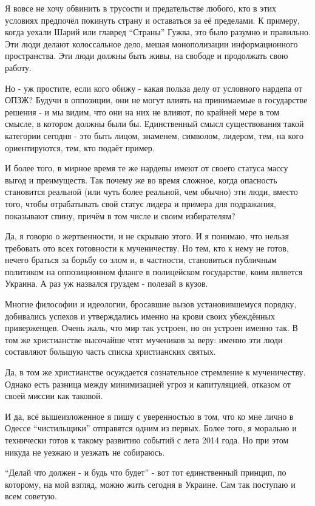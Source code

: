 Я вовсе не хочу обвинить в трусости и предательстве любого, кто в этих условиях
предпочёл покинуть страну и оставаться за её пределами. К примеру, когда уехали
Шарий или главред \enquote{Страны} Гужва, это было разумно и правильно. Эти люди делают
колоссальное дело, мешая монополизации информационного пространства. Эти люди
должны быть живы, на свободе и продолжать свою работу.

Но - уж простите, если кого обижу - какая польза делу от условного нардепа от
ОПЗЖ?  Будучи в оппозиции, они не могут влиять на принимаемые в государстве
решения - и мы видим, что они на них не влияют, по крайней мере в том смысле, в
котором должны были бы. Единственный смысл существования такой категории
сегодня - это быть лицом, знаменем, символом, лидером, тем, на кого
ориентируются, тем, кто подаёт пример.

И более того, в мирное время те же нардепы имеют от своего статуса массу выгод
и преимуществ. Так почему же во время сложное, когда опасность становится
реальной (или чуть более реальной, чем обычно) эти люди, вместо того, чтобы
отрабатывать свой статус лидера и примера для подражания, показывают спину,
причём в том числе и своим избирателям?

Да, я говорю о жертвенности, и не скрываю этого. И я понимаю, что нельзя
требовать ото всех готовности к мученичеству. Но тем, кто к нему не готов,
нечего браться за борьбу со злом и, в частности, становиться публичным
политиком на оппозиционном фланге в полицейском государстве, коим является
Украина. А раз уж назвался груздем - полезай в кузов. 

Многие философии и идеологии, бросавшие вызов установившемуся порядку,
добивались успехов и утверждались именно на крови своих убеждённых
приверженцев. Очень жаль, что мир так устроен, но он устроен именно так. В том
же христианстве высочайше чтят мучеников за веру: именно эти люди составляют
большую часть списка христианских святых. 

Да, в том же христианстве осуждается сознательное стремление к мученичеству.
Однако есть разница между минимизацией угроз и капитуляцией, отказом от своей
миссии как таковой.

И да, всё вышеизложенное я пишу с уверенностью в том, что ко мне лично в Одессе
\enquote{чистильщики} отправятся одним из первых. Более того, я морально и технически
готов к такому развитию событий с лета 2014 года. Но при этом никуда не уезжаю
и уезжать не собираюсь.

\enquote{Делай что должен - и будь что будет} - вот тот единственный принцип, по
которому, на мой взгляд, можно жить сегодня в Украине. Сам так поступаю и всем
советую.
